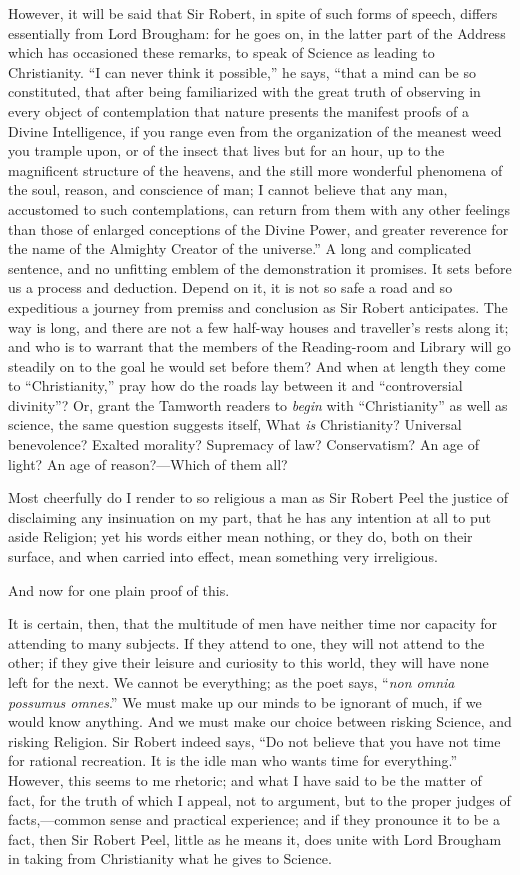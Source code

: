 However, it will be said that Sir Robert, in spite of such forms of
speech, differs essentially from Lord Brougham: for he goes on, in the
latter part of the Address which has occasioned these remarks, to
speak of Science as leading to Christianity. ``I can never think
it possible,'' he says, ``that a mind can be so constituted,
that after being familiarized with the great truth of observing in
every object of contemplation that nature presents the manifest proofs
of a Divine Intelligence, if you range even from the organization of
the meanest weed you trample upon, or of the insect that lives
but for an hour, up to the magnificent structure of the heavens, and
the still more wonderful phenomena of the soul, reason, and conscience
of man; I cannot believe that any man, accustomed to such
contemplations, can return from them with any other feelings than
those of enlarged conceptions of the Divine Power, and greater
reverence for the name of the Almighty Creator of the universe.''
A long and complicated sentence, and no unfitting emblem of the
demonstration it promises. It sets before us a process and deduction.
Depend on it, it is not so safe a road and so expeditious a journey
from premiss and conclusion as Sir Robert anticipates. The way is
long, and there are not a few half-way houses and traveller's rests
along it; and who is to warrant that the members of the Reading-room
and Library will go steadily on to the goal he would set before them?
And when at length they come to ``Christianity,'' pray how do
the roads lay between it and ``controversial divinity''? Or,
grant the Tamworth readers to \emph{begin} with
``Christianity'' as well as science, the same question
suggests itself, What \emph{is} Christianity? Universal benevolence?
Exalted morality? Supremacy of law? Conservatism? An age of light? An
age of reason?—Which of them all?

Most cheerfully do I render to so religious a man as Sir Robert
Peel the justice of disclaiming any insinuation on my part, that he
has any intention at all to put aside Religion; yet his words either
mean nothing, or they do, both on their surface, and when carried into
effect, mean something very irreligious.

And now for one plain proof of this.

It is certain, then, that the multitude of men have neither time
nor capacity for attending to many subjects. If they attend to one,
they will not attend to the other; if they give their leisure
and curiosity to this world, they will have none left for the next. We
cannot be everything; as the poet says, ``\emph{non omnia possumus
omnes}.'' We must make up our minds to be ignorant of much, if
we would know anything. And we must make our choice between risking
Science, and risking Religion. Sir Robert indeed says, ``Do not
believe that you have not time for rational recreation. It is the idle
man who wants time for everything.'' However, this seems to me
rhetoric; and what I have said to be the matter of fact, for the truth
of which I appeal, not to argument, but to the proper judges of facts,—common
sense and practical experience; and if they pronounce it to be a fact,
then Sir Robert Peel, little as he means it, does unite with Lord
Brougham in taking from Christianity what he gives to Science.

